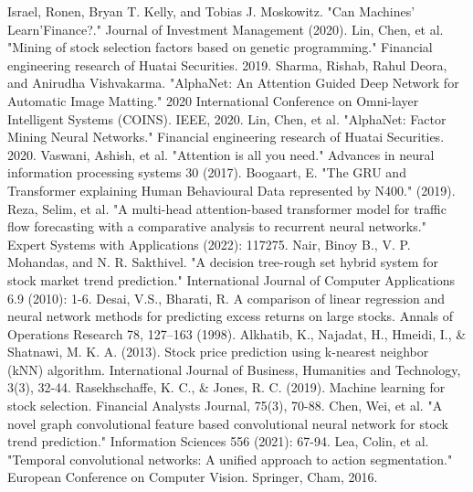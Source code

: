 \documentclass{article}
\begin{document}
\begin{thebibliography}{}
 Israel, Ronen, Bryan T. Kelly, and Tobias J. Moskowitz. "Can Machines' Learn'Finance?." Journal of Investment Management (2020).
 Lin, Chen, et al. "Mining of stock selection factors based on genetic programming." Financial engineering research of Huatai Securities. 2019.
 Sharma, Rishab, Rahul Deora, and Anirudha Vishvakarma. "AlphaNet: An Attention Guided Deep Network for Automatic Image Matting." 2020 International Conference on Omni-layer Intelligent Systems (COINS). IEEE, 2020.
 Lin, Chen, et al. "AlphaNet: Factor Mining Neural Networks." Financial engineering research of Huatai Securities. 2020.
Vaswani, Ashish, et al. "Attention is all you need." Advances in neural information processing systems 30 (2017).
Boogaart, E. "The GRU and Transformer explaining Human Behavioural Data represented by N400." (2019).
Reza, Selim, et al. "A multi-head attention-based transformer model for traffic flow forecasting with a comparative analysis to recurrent neural networks." Expert Systems with Applications (2022): 117275.
 Nair, Binoy B., V. P. Mohandas, and N. R. Sakthivel. "A decision tree-rough set hybrid system for stock market trend prediction." International Journal of Computer Applications 6.9 (2010): 1-6.
 Desai, V.S., Bharati, R. A comparison of linear regression and neural network methods for predicting excess returns on large stocks. Annals of Operations Research 78, 127–163 (1998).
Alkhatib, K., Najadat, H., Hmeidi, I., & Shatnawi, M. K. A. (2013). Stock price prediction using k-nearest neighbor (kNN) algorithm. International Journal of Business, Humanities and Technology, 3(3), 32-44.
Rasekhschaffe, K. C., & Jones, R. C. (2019). Machine learning for stock selection. Financial Analysts Journal, 75(3), 70-88.
Chen, Wei, et al. "A novel graph convolutional feature based convolutional neural network for stock trend prediction." Information Sciences 556 (2021): 67-94.
Lea, Colin, et al. "Temporal convolutional networks: A unified approach to action segmentation." European Conference on Computer Vision. Springer, Cham, 2016.
\end{thebibliography}{}
% 
\end{document}
